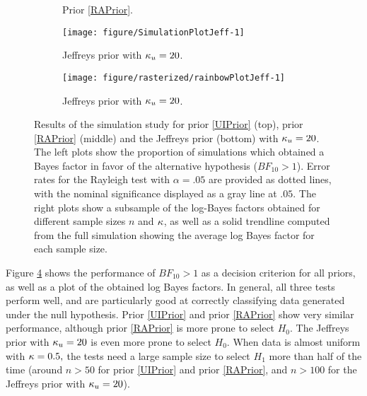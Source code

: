 \begin{figure}
\begin{subfigure}[t]{0.5\linewidth}
\begin{knitrout}
\end{knitrout}
    \caption{Prior \ref{RAPrior}.}\label{fig:logBFplotConjugate2}
  \end{subfigure}
  \begin{subfigure}[t]{0.5\linewidth}\centering
\begin{knitrout}
\color{fgcolor}
\texttt{[image: figure/SimulationPlotJeff-1]} 

\end{knitrout}
    \caption{Jeffreys prior with \(\kappa_u = 20\).}\label{fig:simjefferror}
  \end{subfigure}%
  \begin{subfigure}[t]{0.5\linewidth}\centering
\begin{knitrout}
\color{fgcolor}
\texttt{[image: figure/rasterized/rainbowPlotJeff-1]} 

\end{knitrout}
    \caption{Jeffreys prior with \(\kappa_u = 20\).}\label{fig:simjeffbfs}
  \end{subfigure}
  \caption{Results of the simulation study for prior \ref{UIPrior} (top), prior \ref{RAPrior} (middle) and the Jeffreys prior (bottom) with \(\kappa_u = 20\). The left plots show the proportion of simulations which  obtained a Bayes factor in favor of the alternative hypothesis (\(BF_{10} > 1\)). Error rates for the Rayleigh test with \(\alpha = .05\) are provided as dotted lines, with the nominal significance displayed as a gray line at \(.05\).   The right plots show a subsample of the log-Bayes factors obtained for different sample sizes \(n\) and \(\kappa\), as well as a solid trendline computed from the full simulation showing the average log Bayes factor for each sample size.}
  \label{fig:vmresults}
\end{figure}

Figure \ref{fig:vmresults} shows the performance of \( BF_{10} > 1 \) as a decision criterion for all priors, as well as a plot of the obtained log Bayes factors. In general, all three tests perform well, and are particularly good at correctly classifying data generated under the null hypothesis. Prior \ref{UIPrior} and prior \ref{RAPrior} show very similar performance, although prior \ref{RAPrior} is more prone to select \(H_0\). The Jeffreys prior with \( \kappa_u = 20 \) is even more prone to select \(H_0.\) When data is almost uniform with \( \kappa = 0.5,\) the tests need a large sample size to select \( H_1 \) more than half of the time (around \(n > 50\) for prior \ref{UIPrior} and prior \ref{RAPrior}, and \(n > 100\) for the Jeffreys prior with \(\kappa_u = 20\)).

